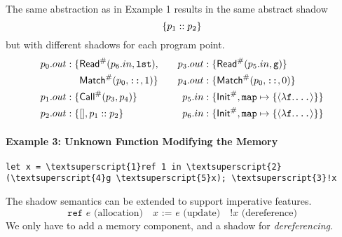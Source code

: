 \documentclass{article}
\begin{document}
The same abstraction as in Example 1 results in the same abstract shadow
\[\{p_1::p_2\}\]
but with different shadows for each program point.
\begin{align*}
  p_0.{out} :\{ & {\mathsf{Read}}^{\#}(p_6.{in},\texttt{lst}), &  &  & p_3.{out}:\{ & {\mathsf{Read}}^{\#}(p_5.{in},\texttt{g})\}                                 \\
                               & {\textsf{Match}}^{\#}(p_0,\texttt{::},1)\}   &  &  & p_4.{out}:\{ & {\textsf{Match}}^{\#}(p_0,\texttt{::},0)\}                                  \\
  p_1.{out} :\{ & {\mathsf{Call}}^{\#}(p_3,p_4)\}                 &  &  & p_5.{in} :\{ & {\mathsf{Init}}^{\#},\texttt{map}\mapsto\{\langle\lambda\texttt{f}.\texttt{...}\rangle\}\} \\
  p_2.{out} :\{ & [],p_1:: p_2\}                     &  &  & p_6.{in} :\{ & {\mathsf{Init}}^{\#},\texttt{map}\mapsto\{\langle\lambda\texttt{f}.\texttt{...}\rangle\}\}
\end{align*}

\paragraph{Example 3: Unknown Function Modifying the Memory}
\begin{center}
  \begin{BVerbatim}[commandchars=\\\{\}]
let x = \textsuperscript{1}ref 1 in \textsuperscript{2}(\textsuperscript{4}g \textsuperscript{5}x); \textsuperscript{3}!x
  \end{BVerbatim}
\end{center}

The shadow semantics can be extended to support imperative features.
\[\texttt{ref }e\text{ (allocation)}\quad x\texttt{ := }e\text{ (update)}\quad\texttt{!}x\text{ (dereference)}\]
We only have to add a memory component, and a shadow for \emph{dereferencing}.
\end{document}
